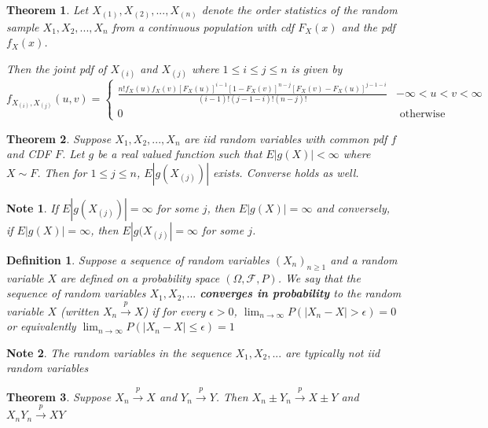 \documentclass[14pt,twoside]{extreport}
\theoremstyle{dotless}
\newtheorem*{defn}{\footnotesize Definition}
\newtheorem*{thm}{\footnotesize Theorem} %
\newtheorem*{note}{\footnotesize Note} %
\begin{document}
\begin{thm}
    Let $X_{(1)}, X_{(2)}, ..., X_{(n)}$ denote the order statistics of the random sample $X_1, X_2, ..., X_n$ from a continuous population with cdf $F_X(x)$ and the pdf $f_X(x)$.

    Then the joint pdf of $X_{(i)}$ and $X_{(j)}$ where $1 \leq i \leq j \leq n$ is given by \\ 
    $ f_{X_{(i)}, X_{(j)}}(u,v) = \begin{cases} \displaystyle \frac{n! f_X(u) f_X(v) [F_X(u)]^{i-1} [1-F_X(v)]^{n-j} [F_X(v) - F_X(u)]^{j-1-i}}{(i-1)!(j-1-i)!(n-j)!} & -\infty < u < v < \infty \\ 0 & \text{ otherwise } \end{cases}$
\end{thm}

\begin{thm}
    Suppose $X_1, X_2, ..., X_n$ are iid random variables with common pdf $f$ and CDF $F$. Let $g$ be a real valued function such that $E|g(X)| < \infty$ where $X \sim F$. Then for $1 \leq j \leq n$, $E|g(X_{(j)})|$ exists. Converse holds as well.
\end{thm}

\begin{note}
    If $E|g(X_{(j)})| = \infty$ for some $j$, then $E|g(X)| = \infty$ and conversely, \\if $E|g(X)|=\infty$, then $E|g(X_{(j)}| = \infty$ for some $j$.
\end{note}

\begin{defn}
    Suppose a sequence of random variables $(X_n)_{n \geq 1}$ and a random variable $X$ are defined on a probability space $(\Omega, \mathcal{F}, P)$. We say that the sequence of random variables $X_1, X_2, ...$ \textbf{converges in probability} to the random variable $X$ (written $X_n \overset{p}{\to} X$) if for every $\epsilon > 0$, $ \lim_{n \to \infty} P(|X_n - X| > \epsilon) = 0$ or equivalently $\lim_{n \to \infty} P(|X_n - X| \leq \epsilon) = 1$
\end{defn}

\begin{note}
    The random variables in the sequence $X_1, X_2, ...$ are typically not iid random variables
\end{note}

\begin{thm}
    Suppose $X_n \overset{p}{\to} X$ and $Y_n \overset{p}{\to} Y$. Then $X_n \pm Y_n \overset{p}{\to} X \pm Y$  and $X_n Y_n \overset{p}{\to} XY$
\end{thm}
\end{document}
